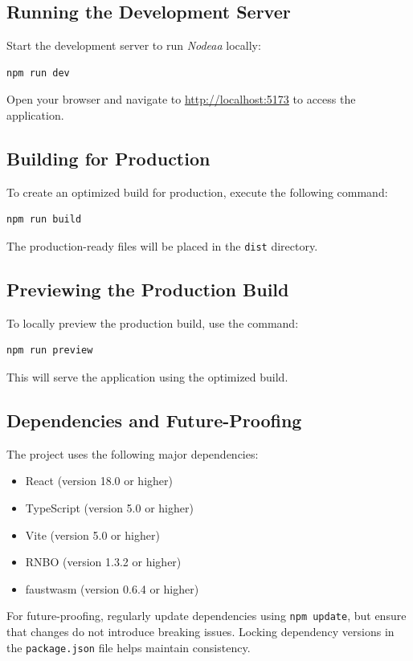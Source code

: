 \documentclass[10pt,twocolumn]{article}
\begin{document}
\subsection{Running the Development Server}

Start the development server to run \textit{Nodeaa} locally:
\begin{verbatim}
npm run dev
\end{verbatim}
Open your browser and navigate to \url{http://localhost:5173} to access the application.

\subsection{Building for Production}

To create an optimized build for production, execute the following command:
\begin{verbatim}
npm run build
\end{verbatim}
The production-ready files will be placed in the \texttt{dist} directory.

\subsection{Previewing the Production Build}

To locally preview the production build, use the command:
\begin{verbatim}
npm run preview
\end{verbatim}
This will serve the application using the optimized build.

\subsection{Dependencies and Future-Proofing}

The project uses the following major dependencies:
\begin{itemize}
    \item React (version 18.0 or higher)
    \item TypeScript (version 5.0 or higher)
    \item Vite (version 5.0 or higher)
    \item RNBO (version 1.3.2 or higher)
    \item faustwasm (version 0.6.4 or higher)
\end{itemize}
For future-proofing, regularly update dependencies using \texttt{npm update}, but ensure that changes do not introduce breaking issues. Locking dependency versions in the \texttt{package.json} file helps maintain consistency.
\end{document}
